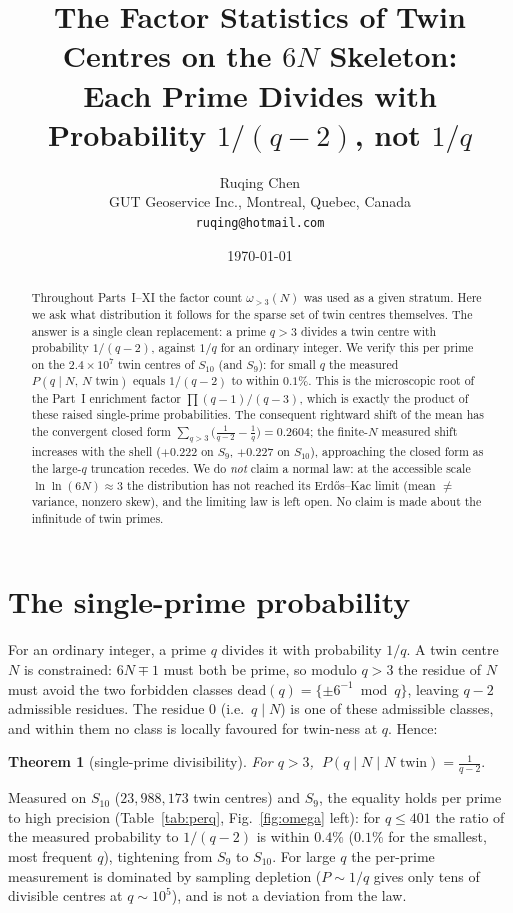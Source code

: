 \documentclass[11pt]{article}
\title{The Factor Statistics of Twin Centres on the $6N$ Skeleton:\\
Each Prime Divides with Probability $1/(q-2)$, not $1/q$}
\author{Ruqing Chen\\
\small GUT Geoservice Inc., Montreal, Quebec, Canada\\
\small \texttt{ruqing@hotmail.com}}
\date{\today}
\newtheorem{theorem}{Theorem}\newtheorem{definition}{Definition}
\begin{document}
\maketitle

\begin{abstract}
Throughout Parts~I--XI the factor count $\omega_{>3}(N)$ was used as a given
stratum. Here we ask what distribution it follows for the sparse set of twin
centres themselves. The answer is a single clean replacement: a prime $q>3$
divides a twin centre with probability $1/(q-2)$, against $1/q$ for an ordinary
integer. We verify this per prime on the $2.4\times10^{7}$ twin centres of
$S_{10}$ (and $S_9$): for small $q$ the measured $P(q\mid N,\,N\text{ twin})$
equals $1/(q-2)$ to within $0.1\%$. This is the microscopic root of the Part~I
enrichment factor $\prod(q-1)/(q-3)$, which is exactly the product of these raised
single-prime probabilities. The consequent rightward shift of the mean has the
convergent closed form $\sum_{q>3}\bigl(\tfrac1{q-2}-\tfrac1q\bigr)=0.2604$; the
finite-$N$ measured shift increases with the shell ($+0.222$ on $S_9$, $+0.227$ on
$S_{10}$), approaching the closed form as the large-$q$ truncation recedes. We do
\emph{not} claim a normal law: at the accessible scale $\ln\ln(6N)\approx3$ the
distribution has not reached its Erd\H{o}s--Kac limit (mean $\ne$ variance,
nonzero skew), and the limiting law is left open. No claim is made about the
infinitude of twin primes.
\end{abstract}

\section{The single-prime probability}

For an ordinary integer, a prime $q$ divides it with probability $1/q$. A twin
centre $N$ is constrained: $6N\mp1$ must both be prime, so modulo $q>3$ the
residue of $N$ must avoid the two forbidden classes
$\mathrm{dead}(q)=\{\pm6^{-1}\bmod q\}$, leaving $q-2$ admissible residues. The
residue $0$ (i.e.\ $q\mid N$) is one of these admissible classes, and within them
no class is locally favoured for twin-ness at $q$. Hence:

\begin{theorem}[single-prime divisibility]\label{thm:prob}
For $q>3$, $\ \displaystyle P(q\mid N \mid N\text{ twin})=\frac{1}{q-2}.$
\end{theorem}

Measured on $S_{10}$ ($23{,}988{,}173$ twin centres) and $S_9$, the equality holds
per prime to high precision (Table~\ref{tab:perq}, Fig.~\ref{fig:omega} left): for
$q\le 401$ the ratio of the measured probability to $1/(q-2)$ is within $0.4\%$
($0.1\%$ for the smallest, most frequent $q$), tightening from $S_9$ to $S_{10}$.
For large $q$ the per-prime measurement is dominated by sampling depletion
($P\sim1/q$ gives only tens of divisible centres at $q\sim10^5$), and is not a
deviation from the law.
\end{document}
